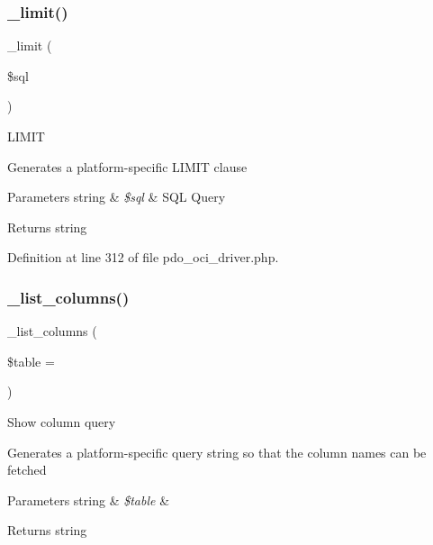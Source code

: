 \subsubsection{\texorpdfstring{\_limit()}{\_limit()}}
{\footnotesize\ttfamily \+\_\+limit (\begin{DoxyParamCaption}\item[{}]{\$sql }\end{DoxyParamCaption})\hspace{0.3cm}{\ttfamily [protected]}}

L\+I\+M\+IT

Generates a platform-\/specific L\+I\+M\+IT clause


\begin{DoxyParams}[1]{Parameters}
string & {\em \$sql} & S\+QL Query \\
\hline
\end{DoxyParams}
\begin{DoxyReturn}{Returns}
string 
\end{DoxyReturn}


Definition at line 312 of file pdo\+\_\+oci\+\_\+driver.\+php.

\mbox{\label{class_c_i___d_b__pdo__oci__driver_a7ccb7f9c301fe7f0a9db701254142b63}} 
\subsubsection{\texorpdfstring{\_list\_columns()}{\_list\_columns()}}
{\footnotesize\ttfamily \+\_\+list\+\_\+columns (\begin{DoxyParamCaption}\item[{}]{\$table = {\ttfamily \textquotesingle{}\textquotesingle{}} }\end{DoxyParamCaption})\hspace{0.3cm}{\ttfamily [protected]}}

Show column query

Generates a platform-\/specific query string so that the column names can be fetched


\begin{DoxyParams}[1]{Parameters}
string & {\em \$table} & \\
\hline
\end{DoxyParams}
\begin{DoxyReturn}{Returns}
string 
\end{DoxyReturn}


